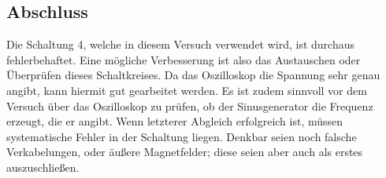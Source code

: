 \subsection{Abschluss}
Die Schaltung 4, welche in diesem Versuch verwendet wird, ist durchaus fehlerbehaftet. Eine mögliche Verbesserung ist also das Austauschen oder Überprüfen dieses Schaltkreises.
Da das Oszilloskop die Spannung sehr genau angibt, kann hiermit gut gearbeitet werden. Es ist zudem sinnvoll vor dem Versuch über das Oszilloskop zu prüfen,
ob der Sinusgenerator die Frequenz erzeugt, die er angibt.
Wenn letzterer Abgleich erfolgreich ist, müssen systematische Fehler in der Schaltung liegen. Denkbar seien noch falsche Verkabelungen, oder äußere Magnetfelder; diese seien aber auch als erstes auszuschließen.



